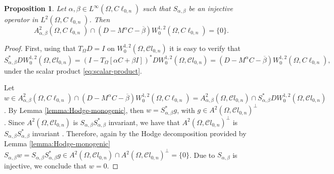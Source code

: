 \documentclass[12pt]{article}
\newtheorem{proposition}[theorem]{Proposition}
\begin{document}
\begin{proposition}\label{prop:empty-2}
Let $\alpha, \beta\in L^{\infty}(\Omega,C\ell_{0,n})$ such that $S_{\alpha,\beta}$ be an injective operator in $L^2(\Omega,C\ell_{0,n})$. Then
\[
  A_{\alpha,\beta}^2(\Omega,C\ell_{0,n})\cap (D-M^{\alpha}C-\overline{\beta}) W_0^{1,2}(\Omega,C\ell_{0,n})=\{0\}.
\]
\end{proposition}
\begin{proof}
First, using that $T_{\Omega}D=I$ on $W_0^{1,2}(\Omega,\mathcal{C}l_{0,n})$ it is easy to verify that 
\[
S_{\alpha,\beta}^*D W_0^{1,2}(\Omega,\mathcal{C}l_{0,n})=(I-T_{\Omega}[\alpha C+\beta I])^*DW_0^{1,2}(\Omega,\mathcal{C}l_{0,n})=(D-M^{\alpha}C-\overline{\beta}) W_0^{1,2}(\Omega,C\ell_{0,n}),
\]
under the scalar product \eqref{eq:scalar-product}. 

Let $w\in A_{\alpha,\beta}^2(\Omega,C\ell_{0,n})\cap (D-M^{\alpha}C-\overline{\beta}) W_0^{1,2}(\Omega,C\ell_{0,n})= A_{\alpha,\beta}^2(\Omega,\mathcal{C}l_{0,n})\cap S_{\alpha,\beta}^*D W_0^{1,2}(\Omega,\mathcal{C}l_{0,n})$. By Lemma \ref{lemma:Hodge-monogenic}, then $w=S_{\alpha,\beta}^*g$, with $g\in A^2(\Omega,\mathcal{C}l_{0,n})^{\bot}$. Since $A^2(\Omega,\mathcal{C}l_{0,n})$ is $S_{\alpha,\beta}S_{\alpha,\beta}^*$ invariant, we have that $A^2(\Omega,\mathcal{C}l_{0,n})^{\bot}$ is $S_{\alpha,\beta}S_{\alpha,\beta}^*$ invariant \cite[Lem.\ 1.6]{Kub2012}. Therefore, again by the Hodge decomposition provided by Lemma \ref{lemma:Hodge-monogenic} $S_{\alpha,\beta}w=S_{\alpha,\beta}S_{\alpha,\beta}^*g\in A^2(\Omega,\mathcal{C}l_{0,n})\cap A^2(\Omega,\mathcal{C}l_{0,n})^{\bot}=\{0\}$. Due to $S_{\alpha,\beta}$ is injective, we conclude that $w=0$. 
\end{proof}

\end{document}
